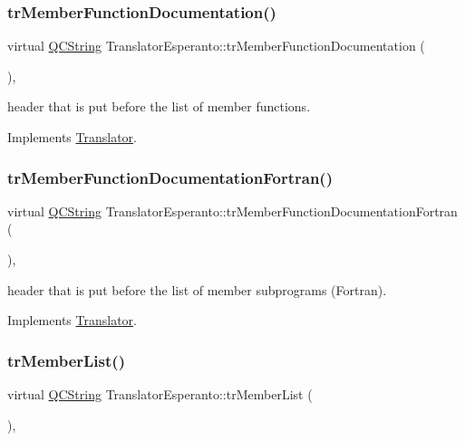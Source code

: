 \subsubsection{\texorpdfstring{trMemberFunctionDocumentation()}{trMemberFunctionDocumentation()}}
{\footnotesize\ttfamily virtual \mbox{\hyperlink{class_q_c_string}{Q\+C\+String}} Translator\+Esperanto\+::tr\+Member\+Function\+Documentation (\begin{DoxyParamCaption}{ }\end{DoxyParamCaption})\hspace{0.3cm}{\ttfamily [inline]}, {\ttfamily [virtual]}}

header that is put before the list of member functions. 

Implements \mbox{\hyperlink{class_translator}{Translator}}.

\mbox{\label{class_translator_esperanto_a7179a0237fa045d31d80cb8e5756a9a0}} 
\subsubsection{\texorpdfstring{trMemberFunctionDocumentationFortran()}{trMemberFunctionDocumentationFortran()}}
{\footnotesize\ttfamily virtual \mbox{\hyperlink{class_q_c_string}{Q\+C\+String}} Translator\+Esperanto\+::tr\+Member\+Function\+Documentation\+Fortran (\begin{DoxyParamCaption}{ }\end{DoxyParamCaption})\hspace{0.3cm}{\ttfamily [inline]}, {\ttfamily [virtual]}}

header that is put before the list of member subprograms (Fortran). 

Implements \mbox{\hyperlink{class_translator}{Translator}}.

\mbox{\label{class_translator_esperanto_a88067bc066b2b8988ec775e5042ccb1c}} 
\subsubsection{\texorpdfstring{trMemberList()}{trMemberList()}}
{\footnotesize\ttfamily virtual \mbox{\hyperlink{class_q_c_string}{Q\+C\+String}} Translator\+Esperanto\+::tr\+Member\+List (\begin{DoxyParamCaption}{ }\end{DoxyParamCaption})\hspace{0.3cm}{\ttfamily [inline]}, {\ttfamily [virtual]}}

